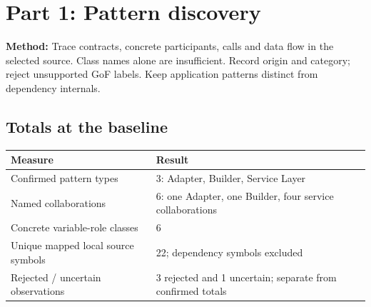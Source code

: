\documentclass[11pt,a4paper]{article}
\newcommand{\entry}[2]{\textbf{#1:} #2\par}
\begin{document}
\section{Part 1: Pattern discovery}
\entry{Method}{Trace contracts, concrete participants, calls and data flow in the selected source. Class names alone are insufficient. Record origin and category; reject unsupported GoF labels. Keep application patterns distinct from dependency internals.}
\subsection{Totals at the baseline}
\begin{tabularx}{\linewidth}{@{}p{75mm}L@{}}\toprule
Measure & Result\\\midrule
Confirmed pattern types & 3: Adapter, Builder, Service Layer\\
Named collaborations & 6: one Adapter, one Builder, four service collaborations\\
Concrete variable-role classes & 6\\
Unique mapped local source symbols & 22; dependency symbols excluded\\
Rejected / uncertain observations & 3 rejected and 1 uncertain; separate from confirmed totals\\
\bottomrule\end{tabularx}
\end{document}
